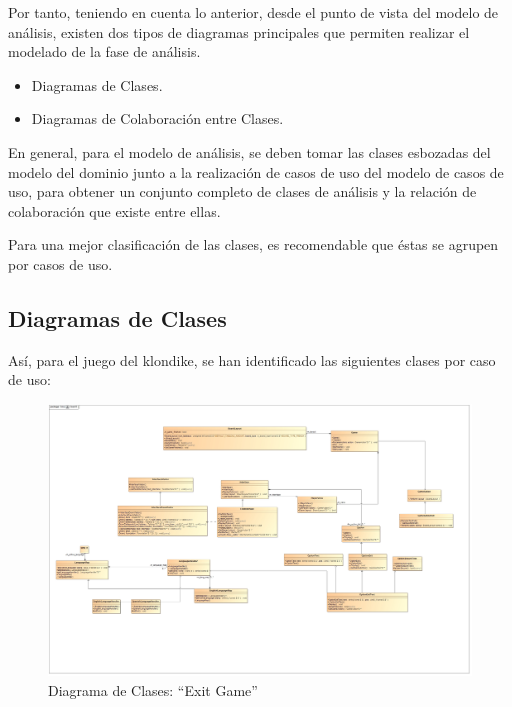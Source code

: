 \documentclass[11pt]{article}
\begin{document}
Por tanto, teniendo en cuenta lo anterior, desde el punto de vista del modelo de análisis, existen dos tipos de diagramas principales que permiten realizar el modelado de la fase de análisis.

\begin{itemize}
\item{Diagramas de Clases}. 
\item{Diagramas de Colaboración entre Clases}.
\end{itemize}

En general, para el modelo de análisis, se deben tomar las clases esbozadas del modelo del dominio junto a la realización de casos de uso del modelo de casos de uso, para obtener un conjunto completo de clases de análisis y la relación de colaboración que existe entre ellas.

Para una mejor clasificación de las clases, es recomendable que éstas se agrupen por casos de uso.

\subsection{Diagramas de Clases}

Así, para el juego del klondike, se han identificado las siguientes clases por caso de uso:

\begin{landscape}
\begin{center}
 \begin{figure}[H]
 \begin{center}
 \includegraphics[scale=0.32]{Analysis/ExitGame00.jpg}
   \caption{Diagrama de Clases: ``Exit Game''}
   \label{fig:exitgame}
 \end{center}
 \end{figure}
\end{center}
\end{landscape}
\restoregeometry
\end{document}
